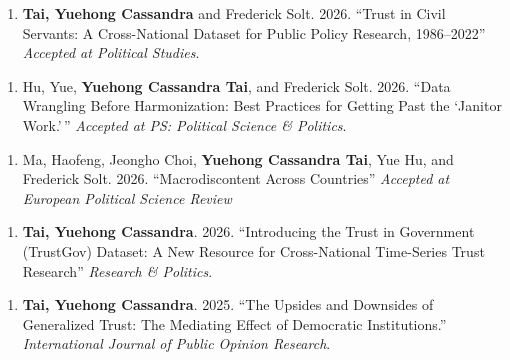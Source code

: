 \documentclass[10.5pt,]{article}
\providecommand{\tightlist}{%
	\setlength{\itemsep}{0pt}\setlength{\parskip}{0pt}}
\renewenvironment{itemize}{
	\begin{list}{}{
			\setlength{\leftmargin}{1.5em}
		}
	}{
	\end{list}
}
\begin{document}
\begin{itemize}
  \begin{itemize}
  \tightlist
  \item
    \begin{enumerate}
    \def\labelenumi{\arabic{enumi}.}
    \setcounter{enumi}{10}
    \tightlist
    \item
      \textbf{Tai, Yuehong Cassandra} and Frederick Solt. 2026. ``Trust
      in Civil Servants: A Cross-National Dataset for Public Policy
      Research, 1986--2022'' \emph{Accepted at Political Studies}.
    \end{enumerate}
  \item
    \begin{enumerate}
    \def\labelenumi{\arabic{enumi}.}
    \setcounter{enumi}{9}
    \tightlist
    \item
      Hu, Yue, \textbf{Yuehong Cassandra Tai}, and Frederick Solt. 2026.
      ``Data Wrangling Before Harmonization: Best Practices for Getting
      Past the `Janitor Work.'\,'' \emph{Accepted at PS: Political
      Science \& Politics}.
    \end{enumerate}
  \item
    \begin{enumerate}
    \def\labelenumi{\arabic{enumi}.}
    \setcounter{enumi}{8}
    \tightlist
    \item
      Ma, Haofeng, Jeongho Choi, \textbf{Yuehong Cassandra Tai}, Yue Hu,
      and Frederick Solt. 2026. ``Macrodiscontent Across Countries''
      \emph{Accepted at European Political Science Review}
    \end{enumerate}
  \item
    \begin{enumerate}
    \def\labelenumi{\arabic{enumi}.}
    \setcounter{enumi}{7}
    \tightlist
    \item
      \textbf{Tai, Yuehong Cassandra}. 2026. ``Introducing the Trust in
      Government (TrustGov) Dataset: A New Resource for Cross-National
      Time-Series Trust Research'' \emph{Research \& Politics}.
    \end{enumerate}
  \item
    \begin{enumerate}
    \def\labelenumi{\arabic{enumi}.}
    \setcounter{enumi}{6}
    \tightlist
    \item
      \textbf{Tai, Yuehong Cassandra}. 2025. ``The Upsides and Downsides
      of Generalized Trust: The Mediating Effect of Democratic
      Institutions.'' \emph{International Journal of Public Opinion
      Research}.
    \end{enumerate}

\end{itemize}
\end{itemize}
\end{document}
